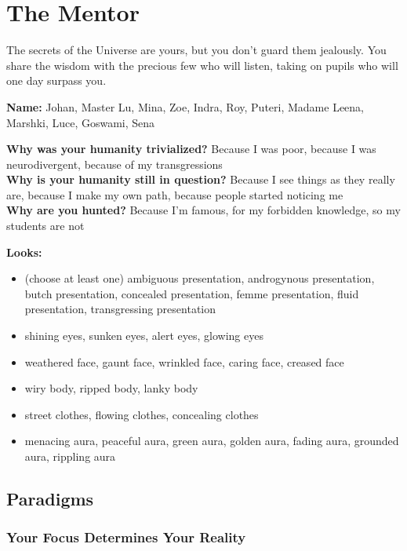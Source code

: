 \documentclass[
]{memoir}
\begin{document}
\newpage

\hypertarget{the-mentor}{%
\section{The Mentor}\label{the-mentor}}

The secrets of the Universe are yours, but you don't guard them
jealously. You share the wisdom with the precious few who will listen,
taking on pupils who will one day surpass you.

\textbf{Name:} Johan, Master Lu, Mina, Zoe, Indra, Roy, Puteri, Madame
Leena, Marshki, Luce, Goswami, Sena

\textbf{Why was your humanity trivialized?} Because I was poor, because
I was neurodivergent, because of my transgressions\\
\textbf{Why is your humanity still in question?} Because I see things as
they really are, because I make my own path, because people started
noticing me\\
\textbf{Why are you hunted?} Because I'm famous, for my forbidden
knowledge, so my students are not

\textbf{Looks:}

\begin{itemize}
\tightlist
\item
  (choose at least one) ambiguous presentation, androgynous
  presentation, butch presentation, concealed presentation, femme
  presentation, fluid presentation, transgressing presentation
\item
  shining eyes, sunken eyes, alert eyes, glowing eyes
\item
  weathered face, gaunt face, wrinkled face, caring face, creased face
\item
  wiry body, ripped body, lanky body
\item
  street clothes, flowing clothes, concealing clothes
\item
  menacing aura, peaceful aura, green aura, golden aura, fading aura,
  grounded aura, rippling aura
\end{itemize}

\hypertarget{paradigms-1}{%
\subsection{Paradigms}\label{paradigms-1}}

\hypertarget{your-focus-determines-your-reality}{%
\subsubsection{Your Focus Determines Your
Reality}\label{your-focus-determines-your-reality}}
\end{document}
